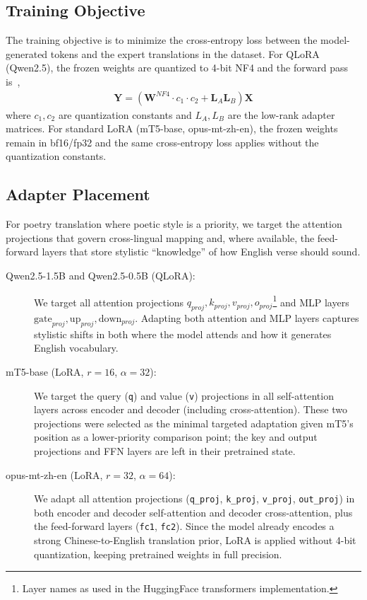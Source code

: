    \subsection{Training Objective}
    The training objective is to minimize the cross-entropy loss between the model-generated tokens and the expert translations in the dataset. For QLoRA (Qwen2.5), the frozen weights are quantized to 4-bit NF4 and the forward pass is~\cite{dettmers2023qlora},
    \begin{gather}
        \textbf{Y} = (\textbf{W}^{NF4}\cdot c_1 \cdot c_2 + \textbf{L}_A \textbf{L}_B)\textbf{X}
    \end{gather}
    where $c_1, c_2$ are quantization constants and $L_A, L_B$ are the low-rank adapter matrices. For standard LoRA (mT5-base, opus-mt-zh-en), the frozen weights remain in bf16/fp32 and the same cross-entropy loss applies without the quantization constants.

    \subsection{Adapter Placement}
    For poetry translation where poetic style is a priority, we target the attention projections that govern cross-lingual mapping and, where available, the feed-forward layers that store stylistic ``knowledge'' of how English verse should sound.
    \begin{description}
        \item[Qwen2.5-1.5B and Qwen2.5-0.5B (QLoRA):] We target all attention projections $q_{proj}, k_{proj}, v_{proj}, o_{proj}$\footnote{Layer names as used in the HuggingFace transformers implementation.} and MLP layers $\text{gate}_{proj}, \text{up}_{proj}, \text{down}_{proj}$. Adapting both attention and MLP layers captures stylistic shifts in both where the model attends and how it generates English vocabulary.

        \item[mT5-base (LoRA, $r=16$, $\alpha=32$):] We target the query (\texttt{q}) and value (\texttt{v}) projections in all self-attention layers across encoder and decoder (including cross-attention). These two projections were selected as the minimal targeted adaptation given mT5's position as a lower-priority comparison point; the key and output projections and FFN layers are left in their pretrained state.

        \item[opus-mt-zh-en (LoRA, $r=32$, $\alpha=64$):] We adapt all attention projections (\texttt{q\_proj}, \texttt{k\_proj}, \texttt{v\_proj}, \texttt{out\_proj}) in both encoder and decoder self-attention and decoder cross-attention, plus the feed-forward layers (\texttt{fc1}, \texttt{fc2}). Since the model already encodes a strong Chinese-to-English translation prior, LoRA is applied without 4-bit quantization, keeping pretrained weights in full precision.

    \end{description}

